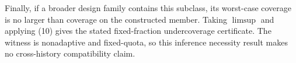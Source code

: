 Finally, if a broader design family contains this subclass, its worst-case coverage is no larger than coverage on the constructed member. Taking \(\limsup\) and applying (10) gives the stated fixed-fraction undercoverage certificate. The witness is nonadaptive and fixed-quota, so this inference necessity result makes no cross-history compatibility claim.